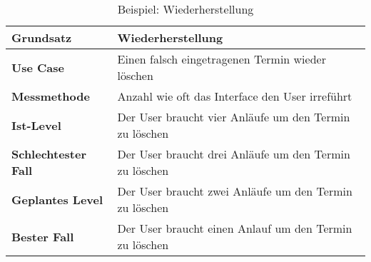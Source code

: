 \begin{table}[h!]
    \centering
    \begin{tabular}{|l|l|}
        \hline
      \textbf{Grundsatz}  & Wiederherstellung \\
      \hline
      \textbf{Use Case}           & Einen falsch eingetragenen Termin wieder löschen  \\
      
      \textbf{Messmethode}     &     Anzahl wie oft das Interface den User irreführt         \\
      
      \textbf{Ist-Level}        &      Der User braucht vier Anläufe um den Termin zu löschen     \\
      
      \textbf{Schlechtester Fall}    &   Der User braucht drei Anläufe um den Termin zu löschen       \\
      
      \textbf{Geplantes Level}     &      Der User braucht zwei Anläufe um den Termin zu löschen        \\
      
      \textbf{Bester Fall}           &     Der User braucht einen Anlauf um den Termin zu löschen        \\
      \hline
    \end{tabular}

    \caption{Beispiel: Wiederherstellung}
    \label{tbl:wiederherstellung}

  \end{table}

